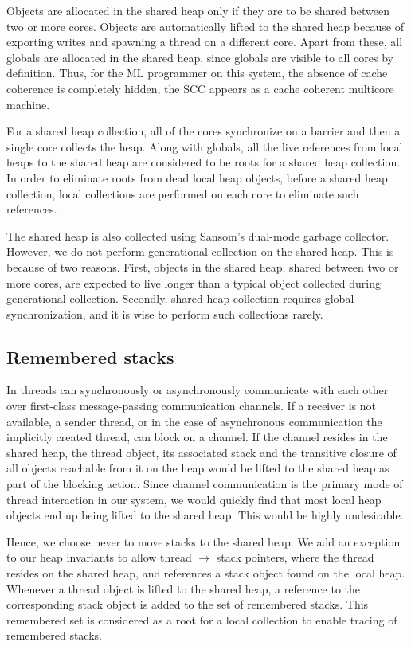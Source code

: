 Objects are allocated in the shared heap only if they are to be shared between
two or more cores. Objects are automatically lifted to the shared heap because
of exporting writes and spawning a thread on a different core. Apart from
these, all globals are allocated in the shared heap, since globals are visible
to all cores by definition. Thus, for the ML programmer on this system, the
absence of cache coherence is completely hidden, the SCC appears as a cache
coherent multicore machine.

For a shared heap collection, all of the cores synchronize on a barrier and
then a single core collects the heap. Along with globals, all the live
references from local heaps to the shared heap are considered to be roots for a
shared heap collection. In order to eliminate roots from dead local heap
objects, before a shared heap collection, local collections are performed on
each core to eliminate such references.

The shared heap is also collected using Sansom's dual-mode garbage collector.
However, we do not perform generational collection on the shared heap. This is
because of two reasons. First, objects in the shared heap, shared between two
or more cores, are expected to live longer than a typical object collected
during generational collection. Secondly, shared heap collection requires
global synchronization, and it is wise to perform such collections rarely.

\subsection{Remembered stacks}

In \MM threads can synchronously or asynchronously communicate with each other
over first-class message-passing communication channels. If a receiver is not
available, a sender thread, or in the case of asynchronous communication the
implicitly created thread, can block on a channel. If the channel resides in
the shared heap, the thread object, its associated stack and the transitive
closure of all objects reachable from it on the heap would be lifted to the
shared heap as part of the blocking action. Since channel communication is the
primary mode of thread interaction in our system, we would quickly find that
most local heap objects end up being lifted to the shared heap. This would be
highly undesirable.

Hence, we choose never to move stacks to the shared heap. We add an exception
to our heap invariants to allow thread $\rightarrow$ stack pointers, where the
thread resides on the shared heap, and references a stack object found on the
local heap. Whenever a thread object is lifted to the shared heap, a reference
to the corresponding stack object is added to the set of remembered stacks.
This remembered set is considered as a root for a local collection to enable
tracing of remembered stacks.

